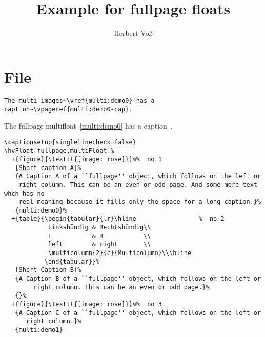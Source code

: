 \documentclass[twocolumn]{scrartcl}
\begin{document}
\title{Example for fullpage floats}
\author{Herbert Voß}
\maketitle

\tableofcontents

\blinddocument

\section{File \texttt{\jobname}}

\begin{lstlisting}
The multi images~\vref{multi:demo0} has a caption~\vpageref{multi:demo0-cap}.
\end{lstlisting}

The fullpage multifloat~\vref{multi:demo0} has a caption~.



\begin{lstlisting}
\captionsetup{singlelinecheck=false}
\hvFloat[fullpage,multiFloat]%
  +{figure}{\texttt{[image: rose]}}%%  no 1
   [Short caption A]%
   {A Caption A of a ``fullpage'' object, which follows on the left or
    right column. This can be an even or odd page. And some more text whch has no
    real meaning because it fills only the space for a long caption.}%
   {multi:demo0}%
  +{table}{\begin{tabular}{lr}\hline                 %  no 2
            Linksbündig & Rechtsbündig\\
            L           & R           \\
            left        & right       \\
            \multicolumn{2}{c}{Multicolumn}\\\hline
           \end{tabular}}%
   [Short Caption B]%
   {A Caption B of a ``fullpage'' object, which follows on the left or
        right column. This can be an even or odd page.}%
   {}%
  +{figure}{\texttt{[image: rose]}}%%  no 3
   {A Caption C of a ``fullpage'' object, which follows on the left or
      right column.}%
   {multi:demo1}
\end{lstlisting}
\end{document}
